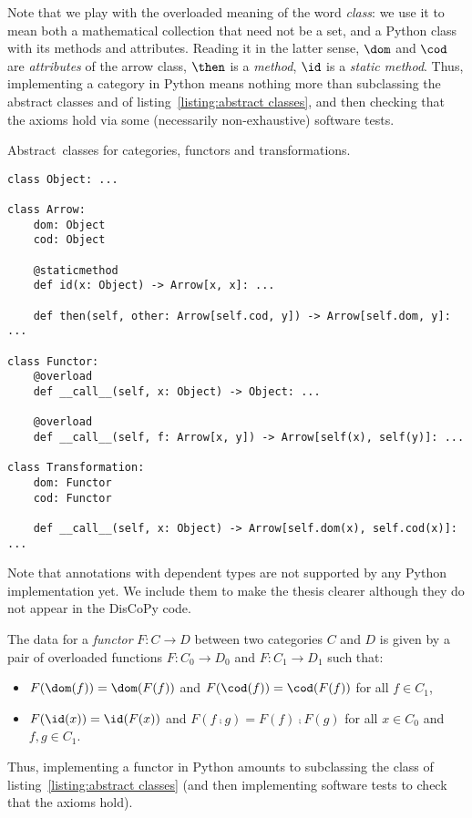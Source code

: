 Note that we play with the overloaded meaning of the word \emph{class}: we use it to mean both a mathematical collection that need not be a set, and a Python class with its methods and attributes.
Reading it in the latter sense, $\dom$ and $\cod$ are \emph{attributes} of the arrow class, $\then$ is a \emph{method}, $\id$ is a \emph{static method}.
Thus, implementing a category in Python means nothing more than subclassing the  abstract classes  and  of listing~\ref{listing:abstract classes}, and then checking that the axioms hold via some (necessarily non-exhaustive) software tests.

\begin{python}\label{listing:abstract classes}
{\normalfont Abstract classes for categories, functors and transformations.}

\begin{verbatim}
class Object: ...

class Arrow:
    dom: Object
    cod: Object

    @staticmethod
    def id(x: Object) -> Arrow[x, x]: ...

    def then(self, other: Arrow[self.cod, y]) -> Arrow[self.dom, y]: ...

class Functor:
    @overload
    def __call__(self, x: Object) -> Object: ...

    @overload
    def __call__(self, f: Arrow[x, y]) -> Arrow[self(x), self(y)]: ...

class Transformation:
    dom: Functor
    cod: Functor

    def __call__(self, x: Object) -> Arrow[self.dom(x), self.cod(x)]: ...
\end{verbatim}

Note that annotations with dependent types are not supported by any Python implementation yet.
We include them to make the thesis clearer although they do not appear in the DisCoPy code.
\end{python}

The data for a \emph{functor} $F : C \to D$ between two categories $C$ and $D$ is given by a pair of overloaded functions $F : C_0 \to D_0$ and $F : C_1 \to D_1$ such that:
\begin{itemize}
    \item $F(\dom(f)) = \dom(F(f))$ and $F(\cod(f)) = \cod(F(f))$ for all $f \in C_1$,
    \item $F(\id(x)) = \id(F(x))$ and $F(f \fcmp g) = F(f) \fcmp F(g)$ for all $x \in C_0$ and $f, g \in C_1$.
\end{itemize}
Thus, implementing a functor in Python amounts to subclassing the  class of listing~\ref{listing:abstract classes} (and then implementing software tests to check that the axioms hold).


